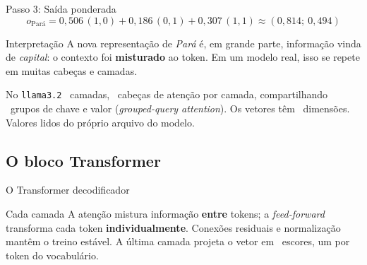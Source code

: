 \documentclass[aspectratio=169]{beamer}
\begin{document}
\begin{frame}{Passo 3: Saída ponderada}
    \footnotesize
    \[
      o_{\text{Pará}} = 0{,}506\,(1,0) + 0{,}186\,(0,1) + 0{,}307\,(1,1) \approx (0{,}814;\ 0{,}494)
    \]
    \pause
    \begin{block}{Interpretação}
        \footnotesize A nova representação de \textit{Pará} é, em grande parte, informação vinda de \textit{capital}: o contexto foi \textbf{misturado} ao token. Em um modelo real, isso se repete em muitas cabeças e camadas.
    \end{block}
    \pause
    \begin{alertblock}{No \texttt{llama3.2}}
        \footnotesize \vLAY\ camadas, \vHEADS\ cabeças de atenção por camada, compartilhando \vKV\ grupos de chave e valor (\textit{grouped-query attention}). Os vetores têm \vEMB\ dimensões. Valores lidos do próprio arquivo do modelo.
    \end{alertblock}
\end{frame}

\subsection{O bloco Transformer}
\begin{frame}[shrink=5]{O Transformer decodificador}
    \centering
    \pause
    \begin{block}{Cada camada}
        \footnotesize A atenção mistura informação \textbf{entre} tokens; a \textit{feed-forward} transforma cada token \textbf{individualmente}. Conexões residuais e normalização mantêm o treino estável. A última camada projeta o vetor em \vVOC\ escores, um por token do vocabulário.
    \end{block}
\end{frame}
\end{document}
